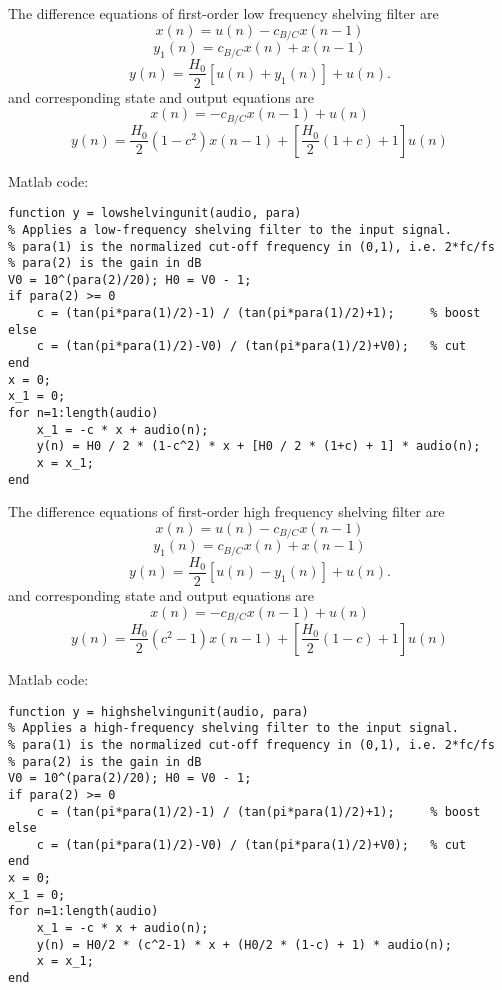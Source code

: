 \documentclass[10pt,a4paper,oneside]{beamer}
\begin{document}
\begin{frame}
The difference equations of first-order low frequency shelving filter are
\[
x(n) = u(n) - c_{B/C}x(n-1)
\]
\[
y_1(n) = c_{B/C}x(n) + x(n-1)
\]
\[
y(n) = \frac{H_0}{2}[u(n) + y_1(n)] + u(n).
\]
and corresponding state and output equations are
\[
x(n) = -c_{B/C}x(n-1) + u(n)
\]
\[
y(n) = \frac{H_0}{2}(1-c^2)x(n-1) + [\frac{H_0}{2}(1+c)+1]u(n)
\]
\end{frame}
\begin{frame}[fragile]
Matlab code:
\begin{lstlisting}
function y = lowshelvingunit(audio, para)
% Applies a low-frequency shelving filter to the input signal.
% para(1) is the normalized cut-off frequency in (0,1), i.e. 2*fc/fs
% para(2) is the gain in dB
V0 = 10^(para(2)/20); H0 = V0 - 1;
if para(2) >= 0
    c = (tan(pi*para(1)/2)-1) / (tan(pi*para(1)/2)+1);     % boost
else
    c = (tan(pi*para(1)/2)-V0) / (tan(pi*para(1)/2)+V0);   % cut
end
x = 0;
x_1 = 0;
for n=1:length(audio)
    x_1 = -c * x + audio(n);
    y(n) = H0 / 2 * (1-c^2) * x + [H0 / 2 * (1+c) + 1] * audio(n);
    x = x_1;
end
\end{lstlisting}
\end{frame}

\begin{frame}
The difference equations of first-order high frequency shelving filter are
\[
x(n) = u(n) - c_{B/C}x(n-1)
\]
\[
y_1(n) = c_{B/C}x(n) + x(n-1)
\]
\[
y(n) = \frac{H_0}{2}[u(n) - y_1(n)] + u(n).
\]
and corresponding state and output equations are
\[
x(n) = -c_{B/C}x(n-1) + u(n)
\]
\[
y(n) = \frac{H_0}{2}(c^2-1)x(n-1) + [\frac{H_0}{2}(1-c)+1]u(n)
\]
\end{frame}
\begin{frame}[fragile]
Matlab code:
\begin{lstlisting}
function y = highshelvingunit(audio, para)
% Applies a high-frequency shelving filter to the input signal.
% para(1) is the normalized cut-off frequency in (0,1), i.e. 2*fc/fs
% para(2) is the gain in dB
V0 = 10^(para(2)/20); H0 = V0 - 1;
if para(2) >= 0
    c = (tan(pi*para(1)/2)-1) / (tan(pi*para(1)/2)+1);     % boost
else
    c = (tan(pi*para(1)/2)-V0) / (tan(pi*para(1)/2)+V0);   % cut
end
x = 0;
x_1 = 0;
for n=1:length(audio)
    x_1 = -c * x + audio(n);
    y(n) = H0/2 * (c^2-1) * x + (H0/2 * (1-c) + 1) * audio(n);
    x = x_1;
end
\end{lstlisting}
\end{frame}
\end{document}

